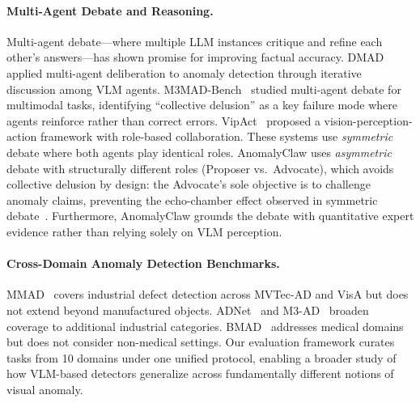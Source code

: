 \paragraph{Multi-Agent Debate and Reasoning.}
Multi-agent debate---where multiple LLM instances critique and refine each other's answers---has shown promise for improving factual accuracy.
DMAD~\citep{li2025dmad} applied multi-agent deliberation to anomaly detection through iterative discussion among VLM agents.
M3MAD-Bench~\citep{liang2026m3mad} studied multi-agent debate for multimodal tasks, identifying ``collective delusion'' as a key failure mode where agents reinforce rather than correct errors.
VipAct~\citep{li2026vipact} proposed a vision-perception-action framework with role-based collaboration.
These systems use \emph{symmetric} debate where both agents play identical roles.
AnomalyClaw uses \emph{asymmetric} debate with structurally different roles (Proposer vs.\ Advocate), which avoids collective delusion by design: the Advocate's sole objective is to challenge anomaly claims, preventing the echo-chamber effect observed in symmetric debate~\citep{liang2026m3mad}.
Furthermore, AnomalyClaw grounds the debate with quantitative expert evidence rather than relying solely on VLM perception.

\paragraph{Cross-Domain Anomaly Detection Benchmarks.}
MMAD~\citep{jiang2024mmad} covers industrial defect detection across MVTec-AD and VisA but does not extend beyond manufactured objects.
ADNet~\citep{li2025adnet} and M3-AD~\citep{chen2025m3ad} broaden coverage to additional industrial categories.
BMAD~\citep{bao2024bmad} addresses medical domains but does not consider non-medical settings.
Our evaluation framework curates tasks from 10 domains under one unified protocol, enabling a broader study of how VLM-based detectors generalize across fundamentally different notions of visual anomaly.
